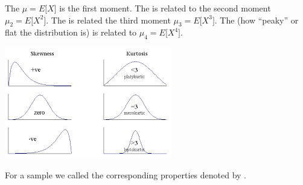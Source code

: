\begin{multicols}{2}

\bi
  \ii The  $\mu = E \lbrack X \rbrack$ is the first moment. 
  \ii The  is related to the second moment $\mu_2 = E \lbrack X^2 \rbrack$.
  \ii The  is related the third moment $\mu_3 = E \lbrack X^3 \rbrack$.
  \ii The  (how ``peaky'' or flat the distribution is) is related to $\mu_4 = E \lbrack X^4 \rbrack$.
  \ei

\columnbreak

\begin{center}
\includegraphics[width=0.5\tw]{15/fig-moments.png}
\end{center}

\end{multicols}

For a sample we called the corresponding properties  denoted by .

\ebox


\clearpage




